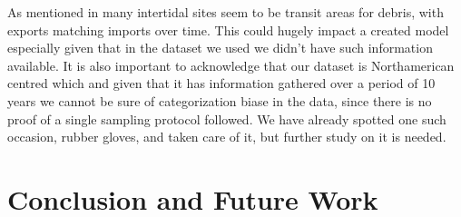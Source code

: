 \documentclass[10pt]{article}\usepackage[]{graphicx}\usepackage[]{color}
\begin{document}
As mentioned in \cite{BROWNE2015} many intertidal sites seem to be transit areas for debris, with exports matching imports over
time. This could hugely impact a created model especially given that in the dataset we used we didn't have such information available. It is also important to acknowledge that our dataset is Northamerican centred which and given that it has information gathered over a period of 10 years we cannot be sure of categorization biase in the data, since there is no proof of a single sampling protocol followed. We have already spotted one such occasion, rubber gloves, and taken care of it, but further study on it is needed.



\pagebreak
\section{Conclusion and Future Work}
\end{document}
